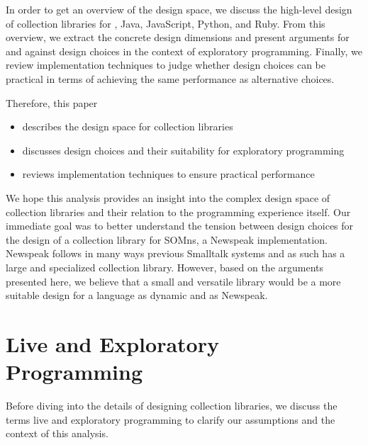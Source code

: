 \documentclass[sigconf, 10pt]{acmart}
\def\SOMns{SOM{\sc ns}\xspace}
\begin{document}
In order to get an overview of the design space,
we discuss the high-level design of collection libraries for
, Java, JavaScript, Python, and Ruby.
From this overview, we extract the concrete design dimensions
and present arguments for and against design choices
in the context of exploratory programming.
Finally, we review implementation techniques
to judge whether design choices can be practical
in terms of achieving the same performance as alternative choices.

Therefore, this paper

\begin{itemize}
  \item describes the design space for collection libraries
  \item discusses design choices and their suitability for exploratory programming
  \item reviews implementation techniques to ensure practical performance
\end{itemize}

We hope this analysis provides an insight
into the complex design space of collection libraries
and their relation to the programming experience itself.
Our immediate goal was to better understand the tension between design choices
for the design of a collection library for \SOMns, a Newspeak implementation\citep{Bracha:10:NS,OptCELWithTruffle}.
Newspeak follows in many ways previous Smalltalk systems
and as such has a large and specialized collection library.
However, based on the arguments presented here,
we believe that a small and versatile library would be a more suitable design
for a language as dynamic and  as Newspeak.


\section{Live and Exploratory Programming}

Before diving into the details of designing collection libraries,
we discuss the terms live and exploratory programming
to clarify our assumptions and the context of this analysis.
\end{document}
